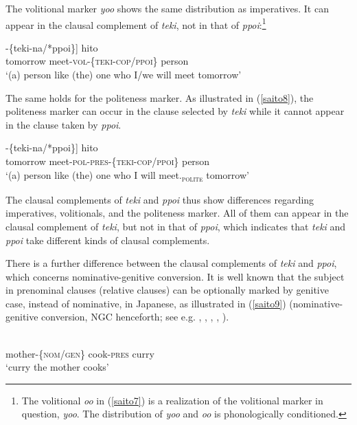\documentclass[output=paper]{langscibook}
\begin{document}
The volitional marker \emph{yoo} shows the same distribution as imperatives. It can appear in the clausal complement of \emph{teki}, not in that of \emph{ppoi}:\footnote{The volitional \emph{oo} in (\ref{saito7}) is a realization of the volitional marker in question, \emph{yoo}. The distribution of \emph{yoo} and \emph{oo} is phonologically conditioned.}


\begin{exe}
\ex \label{saito7}
\gll [[{asita} {a-oo}]-\{{teki-na/*ppoi}\}] {hito}\\
tomorrow meet-\textsc{vol}-\{\textsc{teki-cop/ppoi}\} person\\ 
\glt ‘(a) person like (the) one who I/we will meet tomorrow’
\end{exe}

The same holds for the politeness marker. As illustrated in (\ref{saito8}), the politeness marker can occur in the clause selected by \emph{teki} while it cannot appear in the clause taken by \emph{ppoi}.

\begin{exe}
\ex \label{saito8}
\gll [[{asita} {ai-mas-u}]-\{{teki-na/*ppoi}\}] {hito}\\
tomorrow meet-\textsc{pol-pres}-\{\textsc{teki-cop/ppoi}\} person\\ 
\glt ‘(a) person like (the) one who I will meet.\textsubscript{\textsc{polite}} tomorrow’
\end{exe}

The clausal complements of \emph{teki} and \emph{ppoi} thus show differences regarding imperatives, volitionals, and the politeness marker. All of them can appear in the clausal complement of \emph{teki}, but not in that of \emph{ppoi}, which indicates that \emph{teki} and \emph{ppoi} take different kinds of clausal complements.

There is a further difference between the clausal complements of \emph{teki} and \emph{ppoi}, which concerns nominative-genitive conversion. It is well known that the subject in prenominal clauses (relative clauses) can be optionally marked by genitive case, instead of nominative, in Japanese, as illustrated in (\ref{saito9}) (nominative-genitive conversion, NGC henceforth; see e.g. \citealt{Harada1971}, \citealt{Watanabe1996a}, \citealt{Hiraiwa2000,hiraiwa2005}, \citealt{MakiUchibori2008}, \citealt{miyagawa2011}).

\begin{exe}
\ex \label{saito9}
\\
mother-\{\textsc{nom/gen}\} cook-\textsc{pres} curry\\ 
\glt ‘curry the mother cooks’
\end{exe}
\end{document}
